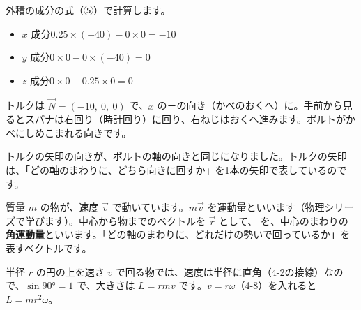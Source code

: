 \par\vspace{4pt}
外積の成分の式（⑤）で計算します。
\begin{itemize}[leftmargin=1.2\zw, itemsep=1pt, topsep=2pt, label={\color{\bkTT}●}]
\item $x$ 成分\enspace $0.25\times(-40)-0\times0=-10$
\item $y$ 成分\enspace $0\times0-0\times(-40)=0$
\item $z$ 成分\enspace $0\times0-0.25\times0=0$
\end{itemize}
トルクは $\vec N=(-10,\ 0,\ 0)$ で、$x$ の－の向き（かべのおくへ）に。手前から見るとスパナは右回り（時計回り）に回り、右ねじはおくへ進みます。ボルトがかべにしめこまれる向きです。
\par\vspace{4pt}
トルクの矢印の向きが、ボルトの軸の向きと同じになりました。トルクの矢印は、「どの軸のまわりに、どちら向きに回すか」を1本の矢印で表しているのです。

質量 $m$ の物が、速度 $\vec v$ で動いています。$m\vec v$ を運動量といいます（物理シリーズで学びます）。中心から物までのベクトルを $\vec r$ として、
を、中心のまわりの\textbf{角運動量}といいます。「どの軸のまわりに、どれだけの勢いで回っているか」を表すベクトルです。

半径 $r$ の円の上を速さ $v$ で回る物では、速度は半径に直角（4-2の接線）なので、$\sin90°=1$ で、大きさは $L=rmv$ です。$v=r\omega$（4-8）を入れると $L=mr^2\omega$。

